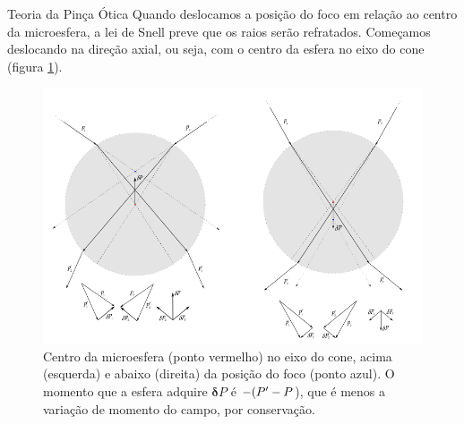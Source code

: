\begin{chapter}{Teoria da Pinça Ótica}
Quando deslocamos a posição do foco em relação ao centro da microesfera, a lei de Snell preve que os raios serão refratados. Começamos deslocando na direção axial, ou seja, com o centro da esfera no eixo do cone (figura \ref{foco_axial}).
%
\begin{figure}[h]
\begin{center}
\includegraphics[scale=.8]{geom_foco_axialII}
\caption{Centro da microesfera (ponto vermelho) no eixo do cone, acima (esquerda) e abaixo (direita) da posição do foco (ponto azul). O momento que a esfera adquire ${\mathbf\delta P}$ é $-({\mathbf \it P'}-{\mathbf \it P}$), que é menos a variação de momento do campo, por conservação.}
\label{foco_axial}
\end{center}
\end{figure}


\end{chapter}
